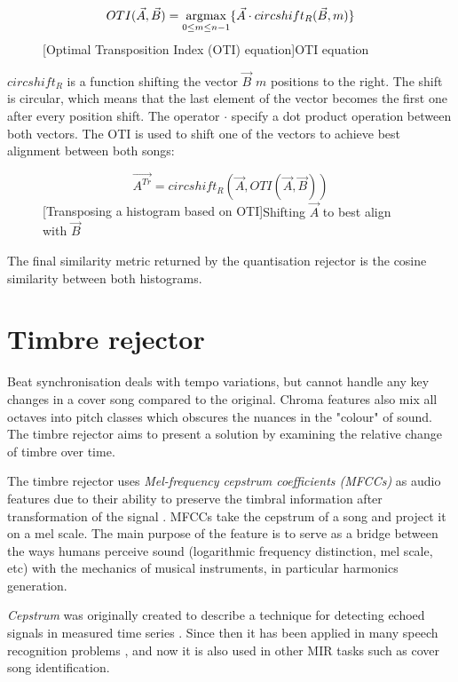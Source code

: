 \begin{figure}[H]
   \begin{equation}
       OTI(\vec{A}, \vec{B}) = \operatorname*{argmax}_{0 \leq m \leq {n-1}}\{\vec{A} \cdot circshift_{R}(\vec{B}, m)\}
   \end{equation}
   [Optimal Transposition Index (OTI) equation]{OTI equation}
\end{figure}

$circshift_R$ is a function shifting the vector $\vec{B}$ $m$ positions to the
right. The shift is circular, which means that the last element of the vector
becomes the first one after every position shift. The operator $\cdot$ specify a
dot product operation between both vectors. The OTI is used to shift one of the
vectors to achieve best alignment between both songs:
\begin{figure}[H]
\begin{equation}
    \vec{A^{Tr}} = circshift_R(\vec{A}, OTI(\vec{A}, \vec{B})) 
\end{equation}
[Transposing a histogram based on OTI]{Shifting $\vec{A}$ to best align with $\vec{B}$}
\end{figure}

The final similarity metric returned
by the quantisation rejector is the cosine similarity between both histograms.

\section{Timbre rejector} 
\label{sec:quantisation}
Beat synchronisation deals with tempo variations, but cannot handle any key
changes in a cover song compared to the original. Chroma features also mix all
octaves into pitch classes which obscures the nuances in the "colour" of sound.
The timbre rejector aims to present a solution by examining the relative change
of timbre over time.

The timbre rejector uses \textit{Mel-frequency cepstrum coefficients (MFCCs)} as
audio features due to their ability to preserve the timbral information after
transformation of the signal \cite{tralie2015cover}. MFCCs take the cepstrum of
a song and project it on a mel scale. The main purpose of the feature is to
serve as a bridge between the ways humans perceive sound (logarithmic frequency
distinction, mel scale, etc) with the mechanics of musical instruments, in
particular harmonics generation.

\textit{Cepstrum} was originally created to describe a technique for detecting
echoed signals in measured time series \cite{martin1986power}. Since then it has
been applied in many speech recognition problems \cite{muda2010voice}
\cite{viikki1998cepstral}, and now it is also used in other MIR tasks such as
cover song identification.


